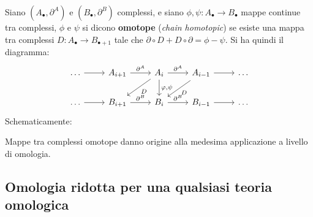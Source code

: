 \begin{definition}
  Siano $ (A_\bullet, \partial^A) $ e $ (B_\bullet, \partial^B) $ complessi, e siano $ \phi, \psi \colon A_\bullet \to B_\bullet $
  mappe continue tra complessi, $ \phi $ e $ \psi $ si dicono \textbf{omotope}
  (\emph{chain homotopic}) se esiste una mappa tra complessi $ D \colon A_\bullet \to B_{\bullet + 1} $
  tale che $ \partial \circ D + D \circ \partial = \phi - \psi $. Si ha quindi il diagramma:
  \[
    \begin{tikzcd}
      \dots \rar & A_{i+1} \rar{\partial^A} & A_i \rar{\partial^A} \arrow{dl}{D} \dar{\phi,\psi} & A_{i-1} \rar \arrow{dl}{D}  & \dots \\
      \dots \rar & B_{i+1} \rar{\partial^B} & B_i \rar{\partial^B} & B_{i-1} \rar & \dots
    \end{tikzcd}
  \]
  Schematicamente:
  \begin{figure}[h]
    \centering
  \end{figure}
\end{definition}
\vspace*{-10pt}
Mappe tra complessi omotope danno origine alla medesima applicazione a livello
di omologia.

\subsection{Omologia ridotta per una qualsiasi teoria omologica}

